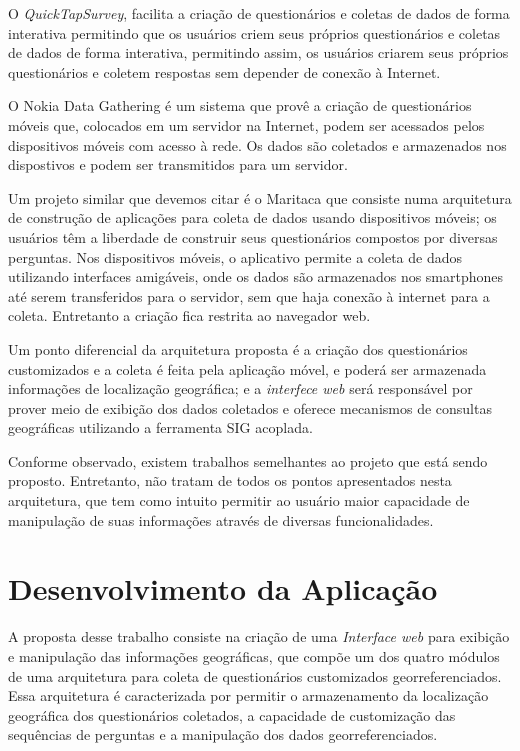 \documentclass[
	12pt,				%
    oneside,			%
	a4paper,			%
	english,			%
	french,				%
	spanish,			%
	brazil,				%
	]{abntex2}
\begin{document}
O \textit{QuickTapSurvey}, facilita a criação de questionários e coletas de dados de forma interativa permitindo que os usuários criem seus próprios questionários e coletas de dados de forma interativa, permitindo assim, os usuários criarem seus próprios questionários e coletem respostas sem depender de conexão à Internet.

O Nokia Data Gathering é um sistema que provê a criação de questionários móveis que, colocados em um servidor na Internet, podem ser acessados pelos dispositivos móveis com acesso à rede. Os dados são coletados e armazenados nos dispostivos e podem ser transmitidos para um servidor. 

Um projeto similar que devemos citar é o Maritaca que consiste numa arquitetura de construção de aplicações para coleta de dados usando dispositivos móveis; os usuários têm a liberdade de construir seus questionários compostos por diversas perguntas. Nos dispositivos móveis, o aplicativo permite a coleta de dados utilizando interfaces amigáveis, onde os dados são armazenados nos smartphones até serem transferidos para o servidor, sem que haja conexão à internet para a coleta. Entretanto a criação fica restrita ao navegador web.

Um ponto diferencial da arquitetura proposta é a criação dos questionários customizados e a coleta é feita pela aplicação móvel, e poderá ser armazenada informações de localização geográfica; e a \textit{interfece web} será responsável por prover meio de exibição dos dados coletados e oferece mecanismos de consultas geográficas utilizando a ferramenta SIG acoplada.

Conforme observado, existem trabalhos semelhantes ao projeto que está sendo proposto. Entretanto, não tratam de todos os pontos apresentados nesta arquitetura, que tem como intuito permitir ao usuário maior capacidade de manipulação de suas informações através de diversas funcionalidades.



\chapter{Desenvolvimento da Aplicação}
A proposta desse trabalho consiste na criação de uma \textit{Interface web} para exibição e manipulação das informações geográficas, que compõe um dos quatro módulos de uma arquitetura para coleta de questionários customizados georreferenciados. Essa arquitetura é caracterizada por permitir o armazenamento da localização geográfica dos questionários coletados, a capacidade de customização das sequências de perguntas e a manipulação dos dados georreferenciados.
\end{document}
